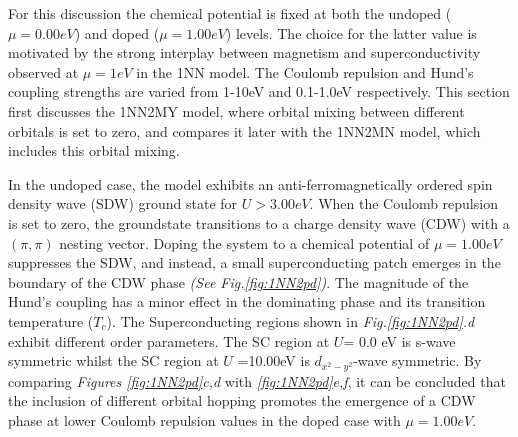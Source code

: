 \documentclass[11pt]{article}
\begin{document}
\noindent For this discussion the chemical potential is fixed at both the undoped ($\mu = 0.00 eV $) and doped ($\mu =1.00 eV$) levels. The choice for the latter value is motivated 
by the strong interplay between magnetism and superconductivity observed at $\mu=1eV$ in the 1NN model.  The Coulomb repulsion and Hund's coupling strengths are varied from 1-10eV and 0.1-1.0eV respectively.
This section first discusses the 1NN2MY model, where orbital mixing between different orbitals is set to zero, and compares it later with the 1NN2MN model, which includes this orbital mixing. \par
\medskip
\noindent In the undoped case, the model exhibits an anti-ferromagnetically ordered spin density wave (SDW) ground state
for $U > 3.00eV$. When the Coulomb repulsion is set to zero, the groundstate transitions to a charge density wave (CDW) with a $(\pi, \pi)$ nesting vector. 
Doping the system to a chemical potential of $\mu = 1.00eV$ suppresses the SDW, and instead, a small superconducting patch 
emerges in the boundary of the CDW phase \textit{(See Fig.{\ref{fig:1NN2pd}})}. The magnitude of the Hund's coupling has a minor effect in the dominating phase and its transition temperature ($T_c$).
The Superconducting regions shown in \textit{Fig.\ref{fig:1NN2pd}.d} exhibit different order parameters. The SC region at $U$= 0.0 eV is s-wave symmetric whilst the SC region at $U$ =10.00eV
is $d_{x^2-y^2}$-wave symmetric. By comparing \textit{Figures \ref{fig:1NN2pd}c,d} with \textit{\ref{fig:1NN2pd}e,f}, it can be concluded that the inclusion of different orbital hopping promotes the emergence of a CDW phase at lower Coulomb repulsion values in the doped case with $\mu = 1.00eV$.
\end{document}
